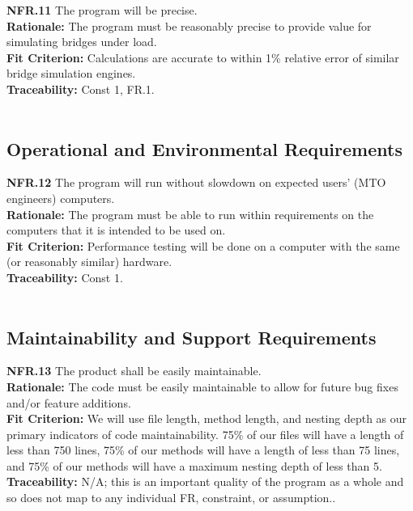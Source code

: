 \documentclass[12pt]{article}
\begin{document}
  \noindent\textbf{NFR.11} The program will be precise.\\
  \textbf{Rationale:} The program must be reasonably precise to provide value for simulating bridges under load.\\
  \textbf{Fit Criterion:} Calculations are accurate to within 1\% relative error of similar bridge simulation engines.\\
  \textbf{Traceability:} Const 1, FR.1.\\\\

\subsection{Operational and Environmental Requirements}

  \textbf{NFR.12} The program will run without slowdown on expected users' (MTO engineers) computers.\\
  \textbf{Rationale:} The program must be able to run within requirements on the computers that it is intended to be used on.\\
  \textbf{Fit Criterion:} Performance testing will be done on a computer with the same (or reasonably similar) hardware.\\
  \textbf{Traceability:} Const 1.\\\\

\subsection{Maintainability and Support Requirements}

  \textbf{NFR.13} The product shall be easily maintainable.\\
  \textbf{Rationale:} The code must be easily maintainable to allow for future bug fixes and/or feature additions.\\
  \textbf{Fit Criterion:} We will use file length, method length, and nesting depth as our primary indicators of code maintainability.
  75\% of our files will have a length of less than 750 lines, 75\% of our methods will have a length of less than 75 lines, and 75\% of our methods will have a maximum nesting depth of less than 5.\\
  \textbf{Traceability:} N/A; this is an important quality of the program as a whole and so does not map to any individual FR, constraint, or assumption..\\\\
\end{document}
